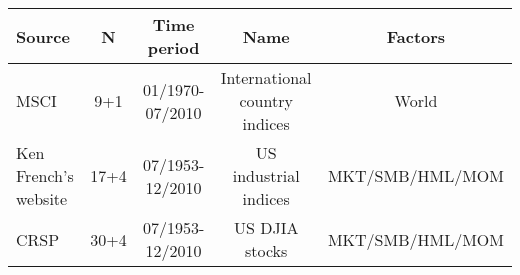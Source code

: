 \begin{tabularx}{1\textwidth}{@{}Xcccc}
\toprule
Source     & N & Time period & Name & Factors \\
\toprule
MSCI & 9+1 & 01/1970-07/2010 & International country indices & World     \\
Ken French's website & 17+4 & 07/1953-12/2010 & US industrial indices & MKT/SMB/HML/MOM \\
CRSP & 30+4 & 07/1953-12/2010 & US DJIA stocks  & MKT/SMB/HML/MOM \\
\bottomrule
\end{tabularx}
